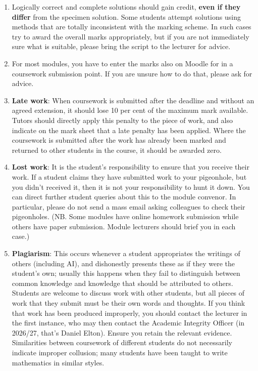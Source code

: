 \documentclass[11pt,a4paper]{amsart}
\begin{document}
\begin{enumerate}
\item Logically correct and complete solutions should gain credit, {\bf even if they differ} from the specimen solution. Some students attempt solutions using methods that are totally inconsistent with the marking scheme. In such cases try to award the overall marks appropriately, but if you are not immediately sure what is suitable, please bring the script to the lecturer for advice.
\item For most modules, you have to enter the marks also on Moodle for in a coursework submission point. 
If you are unsure how to do that, please ask for advice.
\item {\bf Late work}: When coursework is submitted after the deadline and without an agreed extension, it should lose 10 per cent of the maximum mark available. Tutors should directly apply this penalty to the piece of work, and also indicate on the mark sheet that a late penalty has been applied. Where the coursework is submitted after the work has already been marked and returned to other students in the course, it should be awarded zero.
\item {\bf Lost work}: It is the student's responsibility to ensure that you receive their work. If a student claims they have submitted work to your pigeonhole, but you didn't received it, then it is not your responsibility to hunt it down. You can direct further student queries about this to the module convenor. In particular, please do not send a mass email asking colleagues to check their pigeonholes.
(NB. Some modules have online homework submission while others have paper submission. Module lecturers should brief you in each case.)
\item {\bf Plagiarism}: This occurs whenever a student appropriates the writings of others (including AI), and dishonestly presents these as if they were the student's own; usually this happens when they fail to distinguish between common knowledge and knowledge that should be attributed to others. Students are welcome to discuss work with other students, but all pieces of work
that they submit must be their own words and thoughts. If you think that work has been produced improperly, you should contact the lecturer in the first instance, who may then contact the Academic Integrity Officer (in 2026/27, that's Daniel Elton). Ensure you retain the relevant evidence. Similarities between coursework of different students do not necessarily indicate improper collusion; many students have been taught to write mathematics in similar styles.
\end{enumerate}
\end{document}
